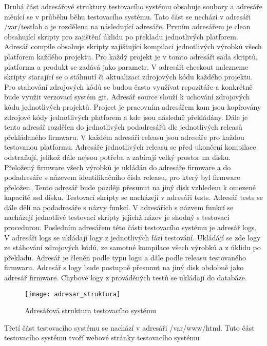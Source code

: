 Druhá část adresářové struktury testovacího systému obsahuje soubory a adresáře měnící se v průběhu běhu testovacího systému. Tato část se nechází v adresáři /var/testlab a je rozdělena na následující adresáře. Prvním adresářem je clean obsahující skripty pro zajištění úklidu po překladu jednotlivých platforem. Adresář compile obsahuje skripty zajišťující kompilaci jednotlivých výrobků všech platforem každého projektu. Pro každý projekt je v tomto adresáři sada skriptů, platforma a produkt se zadává jako parametr. V adresáři checkout nalezneme skripty starající se o  stáhnutí či aktualizaci zdrojových kódu každého projektu. Pro stahování zdrojových kódů se budou často využívat repozitáře a konkrétně bude využit verzovací systém git. Adresář source slouží k uchování zdrojových kódu jednotlivých projektů. Project je pracovním adresářem kam jsou kopírovány zdrojové kódy jednotlivých platforem a kde jsou následně překládány. Dále je tento adresář rozdělen do jednotlivých podadresářů dle jednotlivých releasů překládaného firmwaru. V každém adresáři releasu jsou adresáře pro každou testovanou platformu. Adresáře jednotlivých releasu se před ukončení kompilace odstraňují, jelikož dále nejsou potřeba a zabírají velký prostor na disku. Přeložený firmware všech výrobků je ukládán do adresáře firmware a do podadresáře s názevem identifikačního čísla releasu, pro který byl firmware přeložen. Tento adresář bude později přesunut na jiný disk vzhledem k omezené kapacitě ssd disku. Testovací skripty se nacházejí v adresáři tests. Adresář tests se dále dělí na podadresáře s názvy funkcí. V adresářích s názvem funkcí se nacházejí jednotlivé testovací skripty jejichž název je shodný s testovací procedurou. Posledním adresářem této části testovacího systému je adresář logs. V adresáři logs se ukládají logy z jednotlivých fází testování. Ukládájí se zde logy ze stáhování zdrojových kódů, ze samotné kompilace všech výrobků a z úklidu po překladu. Adresář je členěn podle typu logu a dále podle releasu testovaného firmwaru. Adresář s logy bude postupně přesunut na jiný disk obdobně jako adresář firmware. Chybové logy z prováděných testů se ukládají do databáze.

\begin{figure}[h]
  \centering
  \texttt{[image: adresar\_struktura]}
  \caption{Adresářová struktura testovacího systému}
  \label{fig:adresar_struktura}
\end{figure}

Třetí část testovacího systému se nachází v adresáři /var/www/html. Tuto část testovacího systému tvoří webové stránky testovacího systému

